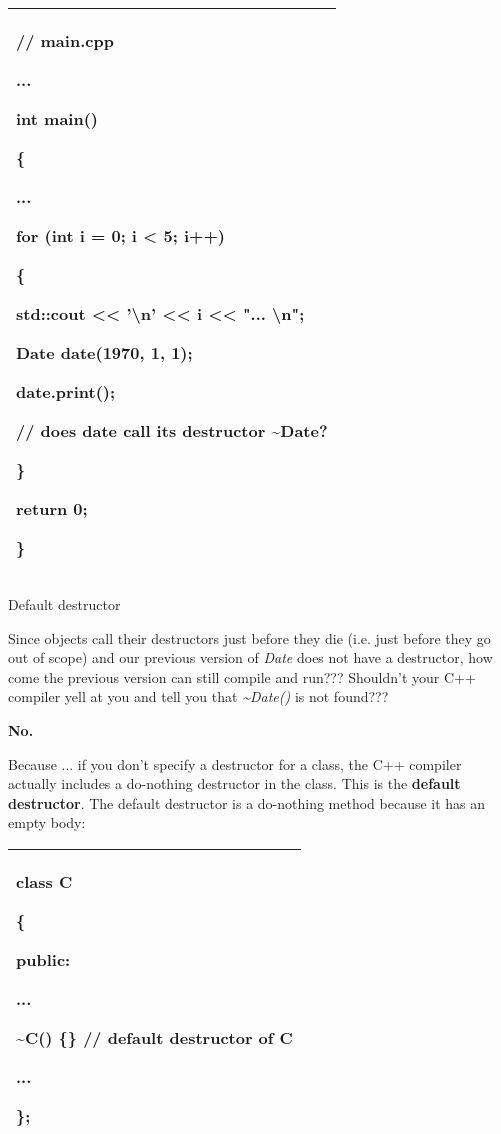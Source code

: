 \documentclass[
]{article}
\begin{document}
\begin{longtable}[]{@{}l@{}}
\toprule
\endhead
\begin{minipage}[t]{0.97\columnwidth}\raggedright
// main.cpp

...

int main()

\{

...

for (int i = 0; i \textless{} 5; i++)

\{

std::cout \textless\textless{} '\textbackslash n' \textless\textless{} i
\textless\textless{} "... \textbackslash n";

Date date(1970, 1, 1);

date.print();

// does date call its destructor \textasciitilde Date?

\}

return 0;

\}\strut
\end{minipage}\tabularnewline
\bottomrule
\end{longtable}

Default destructor

Since objects call their destructors just before they die (i.e. just
before they go out of scope) and our previous version of \emph{Date}
does not have a destructor, how come the previous version can still
compile and run??? Shouldn't your C++ compiler yell at you and tell you
that \emph{\textasciitilde Date()} is not found???

\textbf{No.}

Because ... if you don't specify a destructor for a class, the C++
compiler actually includes a do-nothing destructor in the class. This is
the \textbf{default destructor}. The default destructor is a do-nothing
method because it has an empty body:

\begin{longtable}[]{@{}l@{}}
\toprule
\endhead
\begin{minipage}[t]{0.97\columnwidth}\raggedright
class C

\{

public:

...

\textasciitilde C() \{\} // default destructor of C

...

\};\strut
\end{minipage}\tabularnewline
\bottomrule
\end{longtable}
\end{document}
